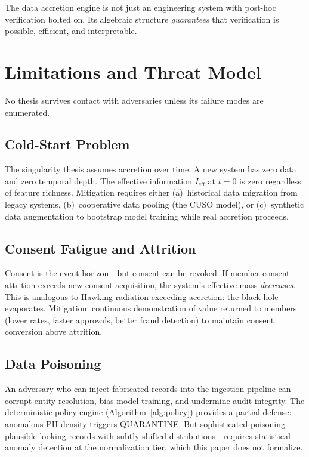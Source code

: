 \documentclass[11pt,twocolumn]{article}
\begin{document}
The data accretion engine is not just an engineering system with post-hoc verification bolted on. Its algebraic structure \emph{guarantees} that verification is possible, efficient, and interpretable.

\section{Limitations and Threat Model}
\label{sec:limitations}

No thesis survives contact with adversaries unless its failure modes are enumerated.

\subsection{Cold-Start Problem}

The singularity thesis assumes accretion over time. A new system has zero data and zero temporal depth. The effective information $I_{\text{eff}}$ at $t=0$ is zero regardless of feature richness. Mitigation requires either (a)~historical data migration from legacy systems, (b)~cooperative data pooling (the CUSO model), or (c)~synthetic data augmentation to bootstrap model training while real accretion proceeds.

\subsection{Consent Fatigue and Attrition}

Consent is the event horizon---but consent can be revoked. If member consent attrition exceeds new consent acquisition, the system's effective mass \emph{decreases}. This is analogous to Hawking radiation exceeding accretion: the black hole evaporates. Mitigation: continuous demonstration of value returned to members (lower rates, faster approvals, better fraud detection) to maintain consent conversion above attrition.

\subsection{Data Poisoning}

An adversary who can inject fabricated records into the ingestion pipeline can corrupt entity resolution, bias model training, and undermine audit integrity. The deterministic policy engine (Algorithm~\ref{alg:policy}) provides a partial defense: anomalous PII density triggers QUARANTINE. But sophisticated poisoning---plausible-looking records with subtly shifted distributions---requires statistical anomaly detection at the normalization tier, which this paper does not formalize.
\end{document}
